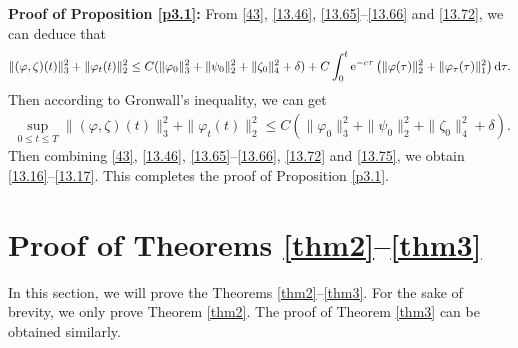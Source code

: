 \documentclass[11pt]{article}
\theoremstyle{plain}
\numberwithin{equation}{section}
\begin{document}
{\bf Proof of Proposition \ref{p3.1}:} From \eqref{43}, \eqref{13.46}, \eqref{13.65}--\eqref{13.66} and \eqref{13.72}, we can deduce that
\begin{align}
			\|(\varphi,\zeta)(t)\|_3^2+\|\varphi_t(t)\|_2^2\leq C(\|\varphi_0\|_3^2+\|\psi_0\|_2^2+\|\zeta_0\|_4^2+\delta)+C\int_{0}^{t}{\rm e}^{-c\tau}\left(\|\varphi(\tau)\|_2^2+\|\varphi_{\tau}(\tau)\|_1^2\right){\rm d}\tau.\notag
		\end{align}
Then according to Gronwall's inequality, we can get
\begin{align}\label{13.75}
			\sup_{0\leq t\leq T}\|(\varphi,\zeta)(t)\|_3^2+\|\varphi_t(t)\|_2^2\leq C(\|\varphi_0\|_3^2+\|\psi_0\|_2^2+\|\zeta_0\|_4^2+\delta).
		\end{align}
		Then combining \eqref{43}, \eqref{13.46}, \eqref{13.65}--\eqref{13.66}, \eqref{13.72} and \eqref{13.75}, we obtain \eqref{13.16}--\eqref{13.17}.
This completes the proof of Proposition \ref{p3.1}.



	\section{Proof of Theorems \ref{thm2}--\ref{thm3}}\label{s4}
	In this section, we will prove the Theorems \ref{thm2}--\ref{thm3}. For the sake of brevity, we only prove Theorem \ref{thm2}. The proof of Theorem \ref{thm3} can be obtained similarly.
\end{document}
